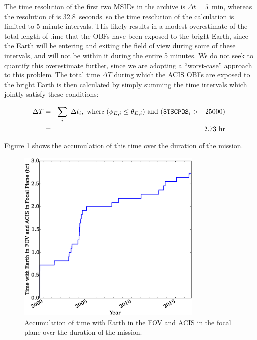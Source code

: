 \documentclass[11pt]{article}
\begin{document}
The time resolution of the first two MSIDs in the archive is $\Delta{t} = 5$~min, whereas the resolution
of  is 32.8~seconds, so the time resolution of the calculation is limited to 5-minute intervals.
This likely results in a modest overestimate of the total length of time that the OBFs have been exposed to
the bright Earth, since the Earth will be entering and exiting the field of view during some of these intervals,
and will not be within it during the entire 5 minutes. We do not seek to quantify this overestimate further, since
we are adopting a ``worst-case'' approach to this problem. The total time $\Delta{T}$ during which the ACIS OBFs are
exposed to the bright Earth is then calculated by simply summing the time intervals which jointly satisfy these
conditions:

\begin{eqnarray}
\Delta{T} &=& \displaystyle\sum_i~\Delta{t_i},~{\rm where}~(\phi_{E,i} \leq \theta_{E,i})~{\rm and}~(\texttt{3TSCPOS}_i > -25000) \\
\nonumber &=& 2.73~{\rm hr}
\end{eqnarray}

\noindent
Figure \ref{fig:time_accum} shows the accumulation of this time over the duration of the mission.

\begin{figure}
\begin{center}
\includegraphics[width=0.8\textwidth]{time_accum.eps}
\caption{Accumulation of time with Earth in the FOV and ACIS in the focal plane over the duration of the mission.\label{fig:time_accum}}
\end{center}
\end{figure}
\end{document}
